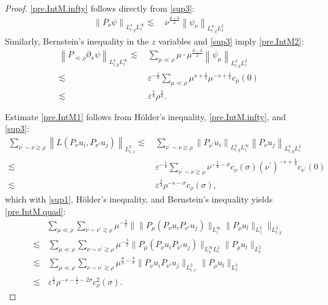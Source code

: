 \documentclass[11pt,letterpaper,reqno]{amsart}
\numberwithin{equation}{section}
\theoremstyle{definition}
\theoremstyle{remark}
\begin{document}
\begin{proof}
\eqref{pre.IntM.infty} follows directly from \eqref{sup3}:
    \begin{align*}
        \left\|    P_{\nu }  \psi \right\|_{L^4_{t,y}L^\infty_z}    
		\lesssim&\,     \nu^{\frac{d-3}{2}}  \left\|  \psi_{\nu }   \right\|_{L^4_{t,y}L^2_z} 
    \end{align*}
    Similarly, Bernstein's inequality in the $z$ variables and \eqref{sup3} imply \eqref{pre.IntM2}:
    \begin{align*}
   \left\|    P_{\ll \rho } \partial_x \psi \right\|_{L^4_{t,y}L^\infty_z}    
		\lesssim&\,    \sum_{\mu\ll \rho} \mu \cdot \mu^{\frac{d-3}{2}}  \left\|  \psi_{\mu }   \right\|_{L^4_{t,y}L^2_z} \\
		\lesssim &\,\varepsilon^{-\frac 18}  \sum_{\mu\ll \rho}   \mu^{s+\frac 12}  \mu^{-s+\frac 14} c_\mu(0)  \\
		\lesssim &\, \varepsilon^{\frac78}   \rho^{ \frac 34}.
    \end{align*}

Estimate \eqref{pre.IntM1} follows from H\"older's inequality, \eqref{pre.IntM.infty}, and \eqref{sup3}:
    \begin{align*}
	\sum_{\nu^\prime \sim \nu \gtrsim \rho}   \left\|	L(P_{ \nu} u_i, P_{\nu'}u_j)\right\|_{L^2_{t,x}} \lesssim&\,  	 	\sum_{\nu^\prime \sim \nu \gtrsim \rho}   \left\|	P_{ \nu^{ \prime}} u_i \right\|_{L^4_{t,y}L^\infty_z}   \left\|P_{\nu}u_j\right\|_{L^4_{t,y}L^2_z} \\
	\lesssim &\, \varepsilon^{-\frac 14}	\sum_{\nu^\prime \sim \nu \gtrsim \rho}   \nu^{-\frac 14-\sigma} c_\nu (\sigma) (\nu^{\prime})^{-s+\frac 14} c_{\nu^\prime} (0) \\
\lesssim&\, \varepsilon^{\frac34}     \rho^{-s-\sigma} c_{\rho} (\sigma),
	\end{align*}
which with \eqref{sup1}, H\"older's inequality, and Bernstein's inequality yields \eqref{pre.IntM.quad}: 
\begin{align*}
    & \sum_{  \mu \ll \rho} \sum_{  \nu\sim \nu^\prime \gtrsim \rho }  \mu^{-\frac 32}  \Big\| \|    	 P_{  \mu } (P_\nu u_i 
 P_{\nu'} u_j) \|_{L^\infty_z} \|   P_{ \rho} u_l  \|_{L^2_z}      \Big\|_{L^2_{t,y}} \\
 \lesssim &\,   \sum_{  \mu \ll \rho} \sum_{  \nu\sim \nu^\prime \gtrsim \rho }   \mu^{-\frac 32} \|    	 P_{  \mu } (P_\nu u_i 
 P_{\nu'} u_j) \|_{L^\infty_x L^2_t} \|   P_{ \rho} u_l  \|_{L^2_x}       \\
 \lesssim &\, \sum_{  \mu \ll \rho}  \sum_{  \nu\sim \nu^\prime \gtrsim \rho }   
 \mu^{ \frac  d2-\frac 32 }  \|    	 P_\nu u_i 
 P_{\nu'} u_j \|_{L^2_{t,x}} \|   P_{ \rho} u_l  \|_{L^2_x}  \\
 \lesssim &\, \varepsilon^{\frac 12} \rho^{-s-\frac 12-2\sigma} c_\rho^2(\sigma).
\end{align*}

   
\end{proof}
\end{document}
